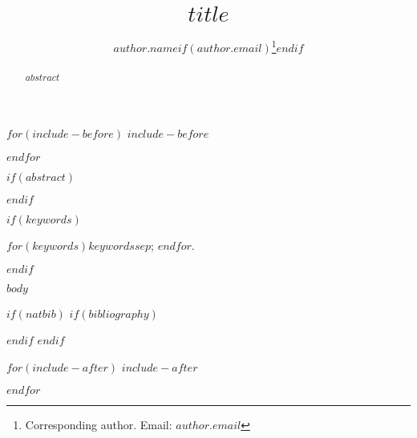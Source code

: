 \documentclass[$for(classoption)$$classoption$$sep$,$endfor$]{jds}
\title[$shorttitle$]{$title$}
\author[$author.affiliation$]{$author.name$$if(author.email)$\thanks{Corresponding author. Email: $author.email$}$endif$}
\affil[$affiliation.id$]{$affiliation.institution$}
\begin{document}
$for(include-before)$
$include-before$

$endfor$


\maketitle

$if(abstract)$
\begin{abstract}
  $abstract$
\end{abstract}
$endif$

$if(keywords)$
\begin{keywords} %
  $for(keywords)$$keywords$$sep$; $endfor$.
\end{keywords}
$endif$


$body$

$if(natbib)$
$if(bibliography)$


$endif$
$endif$

$for(include-after)$
$include-after$

$endfor$
\end{document}
